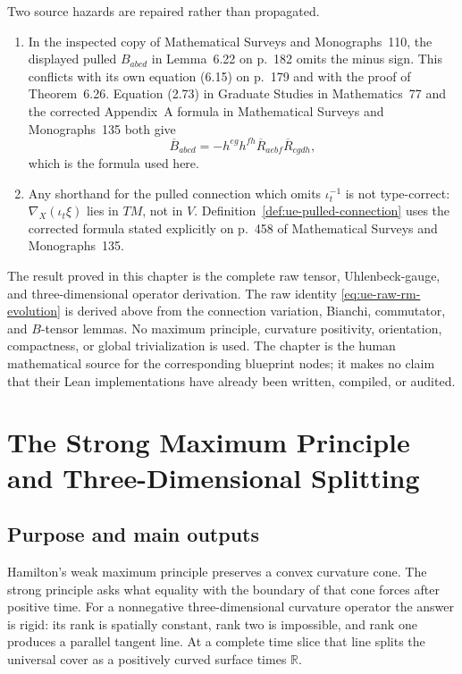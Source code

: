 \documentclass[10pt]{coll-l}
\newcommand{\R}{\mathbb{R}}
\theoremstyle{definition}
\theoremstyle{remark}
\numberwithin{section}{chapter}
\numberwithin{equation}{chapter}
\begin{document}
Two source hazards are repaired rather than propagated.
\begin{enumerate}
\item In the inspected copy of Mathematical Surveys and Monographs~110,
      the displayed pulled $B_{abcd}$ in Lemma~6.22 on p.~182 omits the
      minus sign.  This conflicts with its own equation (6.15) on p.~179
      and with the proof of Theorem~6.26.  Equation (2.73) in Graduate
      Studies in Mathematics~77 and the corrected Appendix~A formula in
      Mathematical Surveys and Monographs~135 both give
      \[
          \overline B_{abcd}
             =-h^{eg}h^{fh}
                 \overline R_{aebf}\overline R_{cgdh},
      \]
      which is the formula used here.
\item Any shorthand for the pulled connection which omits
      $\iota_t^{-1}$ is not type-correct: $\nabla_X(\iota_t\xi)$ lies in
      $TM$, not in $V$.  Definition~\ref{def:ue-pulled-connection} uses the
      corrected formula stated explicitly on p.~458 of Mathematical Surveys
      and Monographs~135.
\end{enumerate}

The result proved in this chapter is the complete raw tensor,
Uhlenbeck-gauge, and three-dimensional operator derivation.  The raw
identity \eqref{eq:ue-raw-rm-evolution} is derived above from the connection
variation, Bianchi, commutator, and $B$-tensor lemmas.  No maximum principle, curvature positivity,
orientation, compactness, or global trivialization is used.  The chapter is
the human mathematical source for the corresponding blueprint nodes; it
makes no claim that their Lean implementations have already been written,
compiled, or audited.

\chapter{The Strong Maximum Principle and Three-Dimensional Splitting}
\label{ch:strong-curvature}

\section{Purpose and main outputs}
\label{sec:strong-curvature-purpose}

Hamilton's weak maximum principle preserves a convex curvature cone.  The
strong principle asks what equality with the boundary of that cone forces
after positive time.  For a nonnegative three-dimensional curvature
operator the answer is rigid: its rank is spatially constant, rank two is
impossible, and rank one produces a parallel tangent line.  At a complete
time slice that line splits the universal cover as a positively curved
surface times $\R$.
\end{document}
